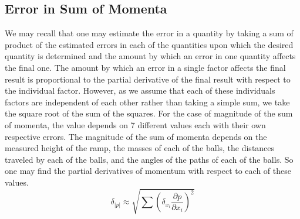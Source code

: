 \documentclass[11pt]{article}
\begin{document}
\subsection{Error in Sum of Momenta}
We may recall that one may estimate the error in a quantity by taking a sum of product of the estimated errors in each of the quantities upon which the desired quantity is determined and the amount by which an error in one quantity affects the final one. The amount by which an error in a single factor affects the final result is proportional to the partial derivative of the final result with respect to the individual factor. However, as we assume that each of these individuals factors are independent of each other rather than taking a simple sum, we take the square root of the sum of the squares. For the case of magnitude of the sum of momenta, the value depends on 7 different values each with their own respective errors. The magnitude of the sum of momenta depends on the measured height of the ramp, the masses of each of the balls, the distances traveled by each of the balls, and the angles of the paths of each of the balls. So one may find the partial derivatives of momentum with respect to each of these values.
\begin{equation}
\delta_{|p|} \approx \sqrt{\sum \left( \delta_{x_i} \frac{\partial p}{ \partial x_i} \right) ^2 } \label{eq:3}
\end{equation}
\end{document}
